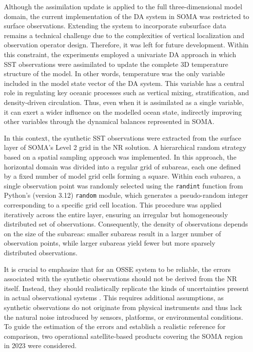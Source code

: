 Although the assimilation update is applied to the full three-dimensional model domain, the current implementation of the DA system in SOMA was restricted to surface observations. Extending the system to incorporate subsurface data remains a technical challenge due to the complexities of vertical localization and observation operator design. Therefore, it was left for future development. Within this constraint, the experiments employed a univariate DA approach in which SST observations were assimilated to update the complete 3D temperature structure of the model. In other words, temperature was the only variable included in the model state vector of the DA system. This variable has a central role in regulating key oceanic processes such as vertical mixing, stratification, and density-driven circulation. Thus, even when it is assimilated as a single variable, it can exert a wider influence on the modelled ocean state, indirectly improving other variables through the dynamical balances represented in SOMA.

In this context, the synthetic SST observations were extracted from the surface layer of SOMA's Level 2 grid in the NR solution. A hierarchical random strategy based on a spatial sampling approach was implemented. In this approach, the horizontal domain was divided into a regular grid of subareas, each one defined by a fixed number of model grid cells forming a square. Within each subarea, a single observation point was randomly selected using the \verb|randint| function from Python's (version 3.12) \verb|random| module, which generates a pseudo-random integer corresponding to a specific grid cell location. This procedure was applied iteratively across the entire layer, ensuring an irregular but homogeneously distributed set of observations. Consequently, the density of observations depends on the size of the subareas: smaller subareas result in a larger number of observation points, while larger subareas yield fewer but more sparsely distributed observations.

It is crucial to emphasize that for an OSSE system to be reliable, the errors associated with the synthetic observations should not be derived from the NR itself. Instead, they should realistically replicate the kinds of uncertainties present in actual observational systems \parencite{halliwell2014Rigorous}. This requires additional assumptions, as synthetic observations do not originate from physical instruments and thus lack the natural noise introduced by sensors, platforms, or environmental conditions. To guide the estimation of the errors and establish a realistic reference for comparison, two operational satellite-based products covering the SOMA region in 2023 were considered.

